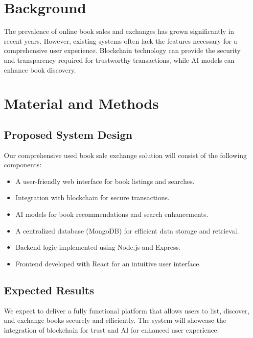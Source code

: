 \documentclass{article}
\begin{document}
\section{Background}
The prevalence of online book sales and exchanges has grown significantly in recent years. However, existing systems often lack the features necessary for a comprehensive user experience. Blockchain technology can provide the security and transparency required for trustworthy transactions, while AI models can enhance book discovery.

\section{Material and Methods}

\subsection{Proposed System Design}
Our comprehensive used book sale exchange solution will consist of the following components:
\begin{itemize}
  \item A user-friendly web interface for book listings and searches.
  \item Integration with blockchain for secure transactions.
  \item AI models for book recommendations and search enhancements.
  \item A centralized database (MongoDB) for efficient data storage and retrieval.
  \item Backend logic implemented using Node.js and Express.
  \item Frontend developed with React for an intuitive user interface.
\end{itemize}

\subsection{Expected Results}
We expect to deliver a fully functional platform that allows users to list, discover, and exchange books securely and efficiently. The system will showcase the integration of blockchain for trust and AI for enhanced user experience.

\end{document}
